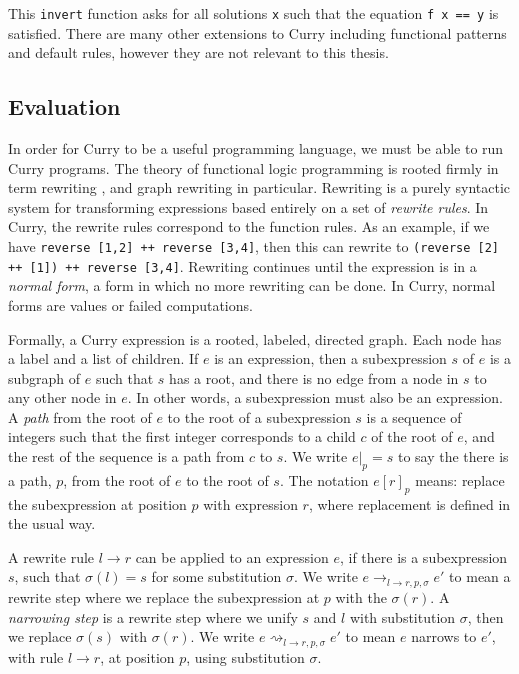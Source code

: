 This \texttt{invert} function asks for all solutions \texttt x such that the equation \texttt{f x == y} is satisfied.
There are many other extensions to Curry including functional patterns and default rules, however
they are not relevant to this thesis.


\subsection{Evaluation}

In order for Curry to be a useful programming language, we must be able to run Curry programs.
The theory of functional logic programming is rooted firmly in term rewriting \cite{Klop92Handbook, Terese03}, 
and graph rewriting \cite{Plump99Handbook, EchahedJanodet97IMAG} in particular.
Rewriting is a purely syntactic system for transforming expressions based entirely on a set of \textit{rewrite rules}.
In Curry, the rewrite rules correspond to the function rules.
As an example, if we have \texttt{reverse [1,2] ++ reverse [3,4]},
then this can rewrite to \texttt{(reverse [2] ++ [1]) ++ reverse [3,4]}.
Rewriting continues until the expression is in a \textit{normal form}, a form in which no more rewriting can be done.
In Curry, normal forms are values or failed computations.

Formally, a Curry expression is a rooted, labeled, directed graph.  Each node has a label and a list of children.
If $e$ is an expression, then a subexpression $s$ of $e$ is a subgraph of $e$ 
such that $s$ has a root, and there is no edge from a node in $s$ to any other node in $e$.
In other words, a subexpression must also be an expression.
A \textit{path} from the root of $e$ to the root of a subexpression $s$ is a sequence of integers such that
the first integer corresponds to a child $c$ of the root of $e$, and the rest of the sequence is a path from $c$ to $s$.
We write $e|_p = s$ to say the there is a path, $p$, from the root of $e$ to the root of $s$.
The notation $e[r]_p$ means: replace the subexpression at position $p$ with expression $r$,
where replacement is defined in the usual way.

A rewrite rule $l \to r$ can be applied to an expression $e$, if there is a subexpression $s$, such that $\sigma(l) = s$
for some substitution $\sigma$.
We write $e\to_{l \to r, p, \sigma} e'$ to mean a rewrite step where we replace the subexpression at $p$ with the $\sigma(r)$.
A \textit{narrowing step} is a rewrite step where we unify \cite{Klop92Handbook} $s$ and $l$ with substitution $\sigma$,
then we replace $\sigma(s)$ with $\sigma(r)$.
We write $e\rightsquigarrow_{l \to r, p, \sigma} e'$ to mean $e$ narrows to $e'$,
with rule $l \to r$, at position $p$, using substitution $\sigma$.

